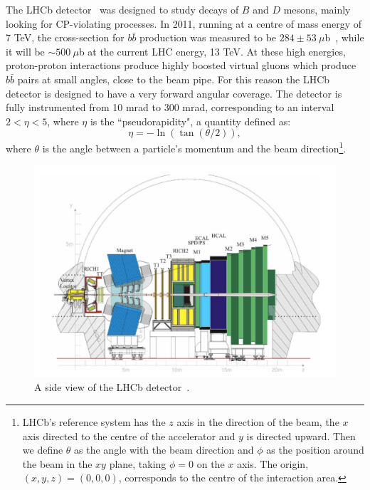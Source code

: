 The LHCb detector~\cite{Alves:2008zz} was designed to study decays of $B$ and $D$ mesons,
mainly looking for CP-violating processes. In 2011, running at a centre of mass energy of 7 TeV, 
the cross-section for $b\bar{b}$ production was measured to be $284 \pm 53 ~\mu$b~\cite{Aaij:2010gn}, 
while it will be $\sim500 ~\mu$b at the current LHC energy, 13 TeV.
At these high energies, proton-proton interactions produce highly boosted virtual gluons which produce $b\bar{b}$
pairs at small angles, close to the beam pipe. For this reason the LHCb detector is designed to have a very forward angular
coverage. The detector is fully instrumented from 10 mrad to 300 mrad, corresponding to an interval
$2 < \eta < 5$, where $\eta$ is the ``pseudorapidity", a quantity defined as:
\begin{equation}
\label{pseudorap}
\eta = - \ln(\tan(\theta/2)),
\end{equation}
where $\theta$ is the angle between a particle's momentum and the beam direction\footnote{LHCb's reference 
system has the $z$ axis in the direction of the beam, the $x$ axis directed to
the centre of the accelerator and $y$ is directed upward. Then we define $\theta$ as the angle with the beam
direction and $\phi$ as the position around the beam in the $xy$ plane, taking $\phi = 0$ on the $x$ axis.
The origin, $(x,y,z)=(0,0,0)$, corresponds to the centre of the interaction area.}.

\begin{figure}[h]
\includegraphics[width=1.\linewidth]{Detector/figs/LHCb_official.png}
\caption{A side view of the LHCb detector~\cite{Alves:2008zz}.}
\label{fig:lhcb}
\end{figure}

